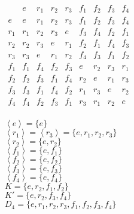 \documentclass[letterpaper,12pt,fleqn]{article}
\newcommand{\cycle}[1]{\left<#1\right>}
\begin{document}
$\begin{array}{c|cccccccc}
  & e & r_1 & r_2 & r_3 & f_1 & f_2 & f_3 & f_4 \\
  \hline
  e & e & r_1 & r_2 & r_3 & f_1 & f_2 & f_3 & f_4 \\
  r_1 & r_1 & r_2 & r_3 & e & f_3 & f_4 & f_2 & f_1 \\
  r_2 & r_2 & r_3 & e & r_1 & f_2 & f_1 & f_4 & f_3 \\
  r_3 & r_3 & e & r_1 & r_2 & f_4 & f_3 & f_1 & f_2 \\
  f_1 & f_1 & f_4 & f_2 & f_3 & e & r_2 & r_3 & r_1 \\
  f_2 & f_2 & f_3 & f_1 & f_4 & r_2 & e & r_1 & r_3 \\
  f_3 & f_3 & f_1 & f_4 & f_2 & r_1 & r_3 & e & r_2 \\
  f_4 & f_4 & f_2 & f_3 & f_1 & r_3 & r_1 & r_2 & e \\
\end{array}$

\begin{minipage}{3in}
  $\cycle{e}=\{e\}$ \\
  $\cycle{r_1}=\cycle{r_3}=\{e,r_1,r_2,r_3\}$ \\
  $\cycle{r_2}=\{e,r_2\}$ \\
  $\cycle{f_1}=\{e,f_1\}$ \\
  $\cycle{f_2}=\{e,f_2\}$ \\
  $\cycle{f_3}=\{e,f_3\}$ \\
  $\cycle{f_4}=\{e,f_4\}$ \\
  $K=\{e, r_2, f_1, f_2\}$ \\
  $K'=\{e, r_2, f_3, f_4\}$ \\
  $D_4=\{e, r_1, r_2, r_3, f_1, f_2, f_3, f_4\}$
\end{minipage}
\begin{minipage}{3in}
\end{minipage}
\end{document}
